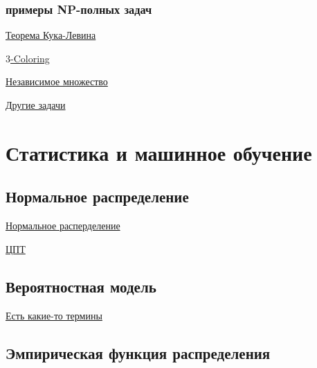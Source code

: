 \documentclass{article}
\begin{document}
\subsubsection{примеры NP-полных задач}

\href{https://neerc.ifmo.ru/wiki/index.php?title=%D0%A2%D0%B5%D0%BE%D1%80%D0%B5%D0%BC%D0%B0_%D0%9A%D1%83%D0%BA%D0%B0}{Теорема Кука-Левина}

\href{https://cgi.csc.liv.ac.uk/~igor/COMP309/3CP.pdf}{$3$-Coloring}

\href{https://neerc.ifmo.ru/wiki/index.php?title=NP-%D0%BF%D0%BE%D0%BB%D0%BD%D0%BE%D1%82%D0%B0_%D0%B7%D0%B0%D0%B4%D0%B0%D1%87%D0%B8_%D0%BE_%D0%BD%D0%B5%D0%B7%D0%B0%D0%B2%D0%B8%D1%81%D0%B8%D0%BC%D0%BE%D0%BC_%D0%BC%D0%BD%D0%BE%D0%B6%D0%B5%D1%81%D1%82%D0%B2%D0%B5}{Независимое множество}

\href{https://neerc.ifmo.ru/wiki/index.php?title=%D0%A2%D0%B5%D0%BE%D1%80%D0%B8%D1%8F_%D1%81%D0%BB%D0%BE%D0%B6%D0%BD%D0%BE%D1%81%D1%82%D0%B8}{Другие задачи}


\section{Статистика и машинное обучение}

\subsection{Нормальное распределение}

\href{https://ru.wikipedia.org/wiki/%D0%9D%D0%BE%D1%80%D0%BC%D0%B0%D0%BB%D1%8C%D0%BD%D0%BE%D0%B5_%D1%80%D0%B0%D1%81%D0%BF%D1%80%D0%B5%D0%B4%D0%B5%D0%BB%D0%B5%D0%BD%D0%B8%D0%B5}{Нормальное расперделение}

\href{https://ru.wikipedia.org/wiki/%D0%A6%D0%B5%D0%BD%D1%82%D1%80%D0%B0%D0%BB%D1%8C%D0%BD%D0%B0%D1%8F_%D0%BF%D1%80%D0%B5%D0%B4%D0%B5%D0%BB%D1%8C%D0%BD%D0%B0%D1%8F_%D1%82%D0%B5%D0%BE%D1%80%D0%B5%D0%BC%D0%B0}{ЦПТ}


\subsection{Вероятностная модель}

\href{https://teach-in.ru/file/synopsis/pdf/probabilistic-model-M.pdf}{Есть какие-то термины}

\subsection{Эмпирическая функция распределения}
\end{document}
